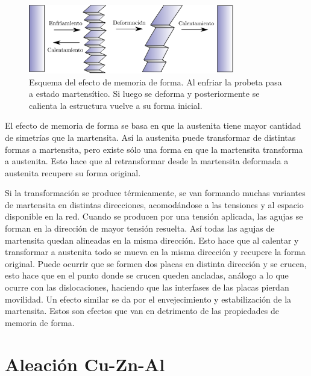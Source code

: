 \documentclass[a4paper,12pt,fleqn,twoside,openany]{book}
\begin{document}
\begin{figure}[h]
 \centering
 \includegraphics[width=0.8\textwidth]{memoria.eps}
 \caption{Esquema del efecto de memoria de forma. Al enfriar la probeta pasa a estado martensítico. Si luego se deforma y posteriormente se calienta
 la estructura vuelve a su forma inicial.} 
 \label{fig:memoria}
 \end{figure}


El efecto de memoria de forma se basa en que la 
austenita tiene mayor cantidad de simetrías que la martensita. Así la austenita puede transformar de distintas formas a martensita, pero existe sólo 
una forma en que la martensita transforma a austenita. Esto hace que al retransformar desde la martensita deformada a austenita recupere su forma 
original.

Si la transformación se produce térmicamente, se van formando muchas variantes de martensita en distintas 
direcciones, acomodándose a las tensiones y al espacio disponible en la red. Cuando se producen por una tensión aplicada, las agujas se forman en la dirección de mayor tensión resuelta. Así todas las agujas de martensita quedan alineadas en la misma dirección. Esto hace que al calentar y 
transformar a austenita todo se mueva en la misma dirección y recupere la forma original. Puede ocurrir que se formen dos placas en distinta dirección 
y se crucen, esto hace que en el punto donde se crucen queden ancladas, análogo a lo que ocurre con las dislocaciones, haciendo que las interfases de las placas pierdan movilidad. Un efecto similar se da por el envejecimiento y estabilización de la martensita. Estos son efectos que van en detrimento de las propiedades de memoria de forma.


\section{Aleación Cu-Zn-Al}
\end{document}

